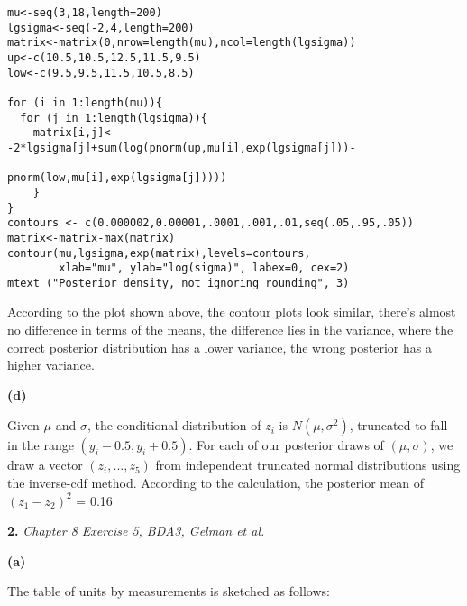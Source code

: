 \documentclass[letterpaper,11pt]{article}
\begin{document}
\begin{lstlisting}
mu<-seq(3,18,length=200)
lgsigma<-seq(-2,4,length=200)
matrix<-matrix(0,nrow=length(mu),ncol=length(lgsigma))
up<-c(10.5,10.5,12.5,11.5,9.5)
low<-c(9.5,9.5,11.5,10.5,8.5)

for (i in 1:length(mu)){
  for (j in 1:length(lgsigma)){
    matrix[i,j]<--2*lgsigma[j]+sum(log(pnorm(up,mu[i],exp(lgsigma[j]))-
                                         pnorm(low,mu[i],exp(lgsigma[j]))))
    }
}
contours <- c(0.000002,0.00001,.0001,.001,.01,seq(.05,.95,.05))
matrix<-matrix-max(matrix)
contour(mu,lgsigma,exp(matrix),levels=contours,
        xlab="mu", ylab="log(sigma)", labex=0, cex=2)
mtext ("Posterior density, not ignoring rounding", 3)
\end{lstlisting}

\begin{center}
  \makebox[\linewidth]{\texttt{[image: 4640HW52]}}
\end{center}

According to the plot shown above, the contour plots look
similar, there's almost no difference in terms of the means, the difference lies in the variance, where the correct posterior distribution has a lower variance, the wrong posterior has a higher variance.

\bigbreak

\begin{addmargin}[-1.1em]{0em} \textbf{(d)}\par \end{addmargin}

Given $\mu$ and $\sigma$, the conditional distribution of $z_i$ is $N(\mu,\sigma^2)$, truncated to fall in the range $(y_i-0.5,y_i+0.5)$. For each of our posterior draws of $(\mu,\sigma)$, we draw a vector $(z_i,...,z_5)$ from independent truncated normal distributions using the inverse-cdf method.
According to the calculation, the posterior mean of $(z_1-z_2)^2$  = 0.16
\newpage

\begin{addmargin}[-2em]{0em} \large{\textbf{2. }}\large{\textsl{Chapter 8 Exercise 5, BDA3, Gelman et al.}} \end{addmargin}



\begin{addmargin}[-1.1em]{0em} \textbf{(a)}\par \end{addmargin}

The table of units by measurements is sketched as follows:
\end{document}
